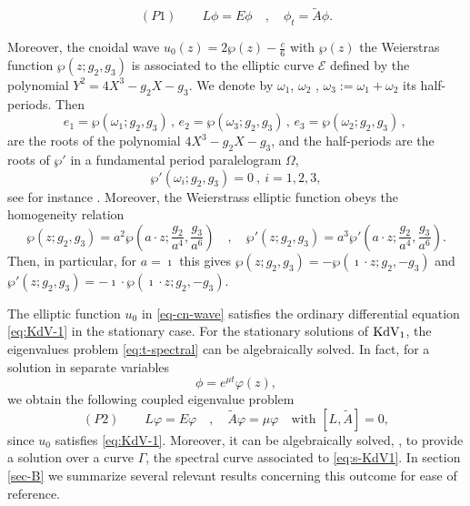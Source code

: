 \documentclass[a4paper,12pt]{article}
\newcommand{\cE}{\mathcal{E}}
\def\KdV{\rm KdV}
\def\KdV{\rm KdV}
\begin{document}
{\begin{equation}\label{eq:t-spectral}
(P1)\qquad    L\phi =E\phi \quad , \quad \phi_t =\widetilde{A} \phi   .
\end{equation}}    


Moreover, the cnoidal wave $u_0(z)=2\wp(z)-\frac{c}{6}   $ with $\wp(z)$  the Weierstras function $\wp (z; g_2 , g_3 )$ is associated to the elliptic curve $\cE$ defined by the polynomial $Y^2 = 4X^3-g_2 X -g_3$. We denote by $\omega_1$, $\omega_2$ , $\omega_3 := \omega_1 +\omega_2$ its half-periods. Then
$$
e_1 = \wp (\omega_1 ; g_2 , g_3 ) \, ,\, 
e_2 = \wp (\omega_3 ; g_2 , g_3 ) \, ,\, 
e_3 = \wp (\omega_2 ; g_2 , g_3 ) \, ,\, 
$$
are the roots of the polynomial $4X^3-g_2 X -g_3$, and the half-periods are the roots of $\wp'$ in a fundamental period paralelogram $\Omega$,
\begin{equation}\label{def-ceros-wpp}
    \wp' (\omega_i ; g_2 , g_3 ) = 0  \  , \ i = 1,  2 , 3, 
\end{equation}
see for instance \cite{pastras2020weierstrass}. Moreover, the Weierstrass elliptic function obeys the homogeneity relation 
\begin{equation}\label{elliptic_homogeneity}
 \wp (z; g_2 , g_3 )= a^2 \wp (a \cdot z ; \frac{g_2 }{a^4 } , \frac{g_3 }{a^6 } )
\quad , \quad 
\wp' (z;g_2 , g_3 )= a^3 \wp' (a \cdot z ; \frac{g_2 }{a^4 } , \frac{g_3 }{a^6 } ).   
\end{equation} 
Then, in particular, for $a=\imath$ this gives $ \wp (z; g_2 , g_3 )= - \wp (\imath  \cdot z ; {g_2 } , -{g_3 } )$ and $ \wp' (z; g_2 , g_3 )= - \imath \cdot \wp (\imath  \cdot z ; {g_2 } , -{g_3 } )$. 



The elliptic function $u_0$   in \eqref{eq-cn-wave} satisfies   the ordinary differential equation \eqref{eq:KdV-1} in the stationary case.  For the stationary solutions of $\KdV_1$,  the eigenvalues problem \eqref{eq:t-spectral} can be  algebraically solved. In fact, for a solution in  separate variables 
{\begin{equation}
\phi= e^{\mu t} \varphi (z) ,    
\end{equation}}
we obtain the following coupled eigenvalue problem  
{\begin{equation}\label{eq:s-KdV1}
(P2)\qquad     L\varphi =E\varphi \quad , \quad \widetilde{A} \varphi = \mu \varphi \quad \textrm{with } [L, \widetilde{A}]= 0 ,
\end{equation}}
since $u_0$ satisfies \eqref{eq:KdV-1}.
Moreover, it can be  algebraically solved, \cite{MRZ2}, to provide a solution over a curve $\Gamma$, the spectral curve associated to  \eqref{eq:s-KdV1}. In section \ref{sec-B} we summarize several relevant results concerning this outcome for ease of reference.
\end{document}
